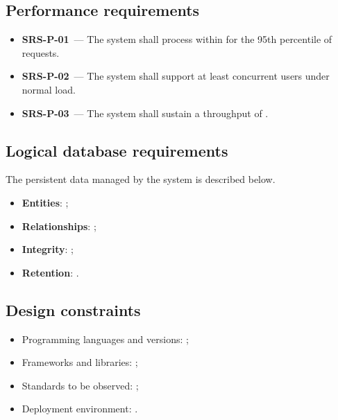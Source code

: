 \documentclass[12pt,a4paper]{extarticle}
\begin{document}
\subsection{Performance requirements}
\label{sec:performance}

\begin{itemize}[leftmargin=1.25cm]
    \item \textbf{SRS-P-01}~--- The system shall process  within  for the 95th percentile of requests.
    \item \textbf{SRS-P-02}~--- The system shall support at least  concurrent users under normal load.
    \item \textbf{SRS-P-03}~--- The system shall sustain a throughput of .
\end{itemize}

\subsection{Logical database requirements}
\label{sec:database}

The persistent data managed by the system is described below.
\begin{itemize}[leftmargin=1.25cm]
    \item \textbf{Entities}: ;
    \item \textbf{Relationships}: ;
    \item \textbf{Integrity}: ;
    \item \textbf{Retention}: .
\end{itemize}

\subsection{Design constraints}
\label{sec:constraints}

\begin{itemize}[leftmargin=1.25cm]
    \item Programming languages and versions: ;
    \item Frameworks and libraries: ;
    \item Standards to be observed: ;
    \item Deployment environment: .
\end{itemize}
\end{document}
